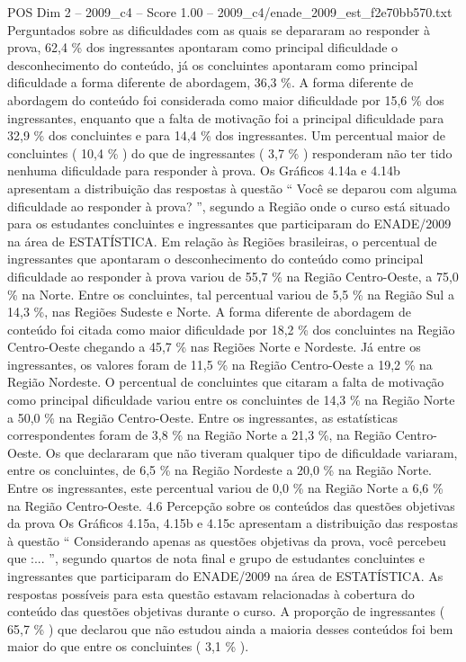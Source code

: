 \begin{textsample}{POS Dim 2 – 2009\_c4 – Score 1.00 – 2009\_c4/enade\_2009\_est\_f2e70bb570.txt}
Perguntados sobre as dificuldades com as quais se depararam ao responder à prova, 62,4 \% dos ingressantes apontaram como principal dificuldade o desconhecimento do conteúdo, já os concluintes apontaram como principal dificuldade a forma diferente de abordagem, 36,3 \%.
A forma diferente de abordagem do conteúdo foi considerada como maior dificuldade por 15,6 \% dos ingressantes, enquanto que a falta de motivação foi a principal dificuldade para 32,9 \% dos concluintes e para 14,4 \% dos ingressantes.
Um percentual maior de concluintes ( 10,4 \% ) do que de ingressantes ( 3,7 \% ) responderam não ter tido nenhuma dificuldade para responder à prova.
Os Gráficos 4.14a e 4.14b apresentam a distribuição das respostas à questão “ Você se deparou com alguma dificuldade ao responder à prova? ”, segundo a Região onde o curso está situado para os estudantes concluintes e ingressantes que participaram do ENADE/2009 na área de ESTATÍSTICA.
Em relação às Regiões brasileiras, o percentual de ingressantes que apontaram o desconhecimento do conteúdo como principal dificuldade ao responder à prova variou de 55,7 \% na Região Centro-Oeste, a 75,0 \% na Norte.
Entre os concluintes, tal percentual variou de 5,5 \% na Região Sul a 14,3 \%, nas Regiões Sudeste e Norte.
A forma diferente de abordagem de conteúdo foi citada como maior dificuldade por 18,2 \% dos concluintes na Região Centro-Oeste chegando a 45,7 \% nas Regiões Norte e Nordeste.
Já entre os ingressantes, os valores foram de 11,5 \% na Região Centro-Oeste a 19,2 \% na Região Nordeste.
O percentual de concluintes que citaram a falta de motivação como principal dificuldade variou entre os concluintes de 14,3 \% na Região Norte a 50,0 \% na Região Centro-Oeste.
Entre os ingressantes, as estatísticas correspondentes foram de 3,8 \% na Região Norte a 21,3 \%, na Região Centro-Oeste.
Os que declararam que não tiveram qualquer tipo de dificuldade variaram, entre os concluintes, de 6,5 \% na Região Nordeste a 20,0 \% na Região Norte.
Entre os ingressantes, este percentual variou de 0,0 \% na Região Norte a 6,6 \% na Região Centro-Oeste. 4.6 Percepção sobre os conteúdos das questões objetivas da prova Os Gráficos 4.15a, 4.15b e 4.15c apresentam a distribuição das respostas à questão “ Considerando apenas as questões objetivas da prova, você percebeu que :... ”, segundo quartos de nota final e grupo de estudantes concluintes e ingressantes que participaram do ENADE/2009 na área de ESTATÍSTICA.
As respostas possíveis para esta questão estavam relacionadas à cobertura do conteúdo das questões objetivas durante o curso.
A proporção de ingressantes ( 65,7 \% ) que declarou que não estudou ainda a maioria desses conteúdos foi bem maior do que entre os concluintes ( 3,1 \% ).

\end{textsample}
